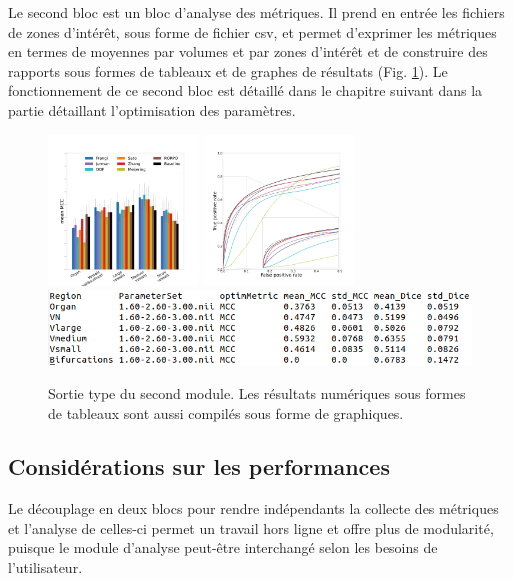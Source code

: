 Le second bloc est un bloc d'analyse des métriques. Il prend en entrée les fichiers de zones d'intérêt, sous forme de fichier csv, et permet d'exprimer les métriques en termes de moyennes par volumes et par zones d'intérêt et de construire des rapports sous formes de tableaux et de graphes de résultats (Fig. \ref{fig:bench_module2}). Le fonctionnement de ce second bloc est détaillé dans le chapitre suivant dans la partie détaillant l'optimisation des paramètres. 

\begin{figure}[!ht]
  \centering
  \includegraphics[height=4cm]{Images/bench_Ircad_PS_MCC.pdf}
  \includegraphics[height=4cm]{Images/bench_Ircad_ROC.pdf}
  \includegraphics[width=\textwidth]{Images/bench_type_of_results.png}
  \caption{Sortie type du second module. Les résultats numériques sous formes de tableaux sont aussi compilés sous forme de graphiques.}
  \label{fig:bench_module2}
\end{figure}

\subsection{Considérations sur les performances}

Le découplage en deux blocs pour rendre indépendants la collecte des métriques et l'analyse de celles-ci permet un travail hors ligne et offre plus de modularité, puisque le module d'analyse peut-être interchangé selon les besoins de l'utilisateur. 

